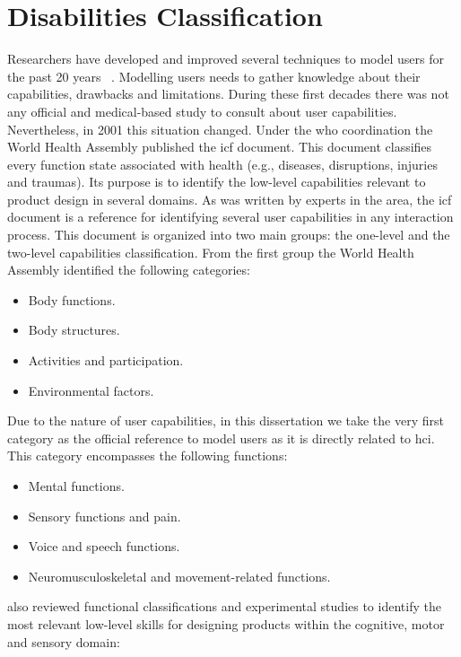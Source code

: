 
\chapter{Disabilities Classification}
\label{cha:appendixA}

Researchers have developed and improved several techniques to model users for 
the past 20 years~\citep{petrelli_user_centered_1999} \citep{fink_adaptable_1997}. 
Modelling users needs to gather knowledge about their capabilities, drawbacks and 
limitations. During these first decades there was not any official and medical-based 
study to consult about user capabilities. Nevertheless, in 2001 this situation 
changed. Under the \ac{who} coordination the World Health Assembly published the
\ac{icf} document. This document classifies every function state associated with 
health (e.g., diseases, disruptions, injuries and traumas). Its purpose is to 
identify the low-level capabilities relevant to product design in several 
domains. As was written by experts in the area, the \ac{icf} document is a 
reference for identifying several user capabilities in any interaction process. 
This document is organized into two main groups: the one-level and the two-level 
capabilities classification. From the first group the World Health Assembly 
identified the following categories:

\begin{itemize}
  \item Body functions.
  \item Body structures.
  \item Activities and participation.
  \item Environmental factors.
\end{itemize}

Due to the nature of user capabilities, in this dissertation we take the very 
first category as the official reference to model users as it is directly 
related to \ac{hci}. This category encompasses the following functions:

\begin{itemize}
  \item Mental functions.
  \item Sensory functions and pain.
  \item Voice and speech functions.
  \item Neuromusculoskeletal and movement-related functions.
\end{itemize}


\citeauthor{persad_cognitive_2007} also reviewed functional classifications 
and experimental studies to identify the most relevant low-level skills for 
designing products within the cognitive, motor and sensory domain:

